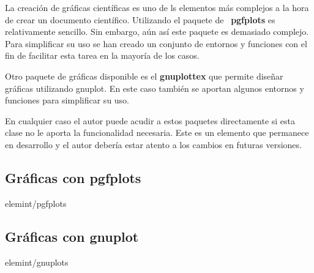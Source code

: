 La creación de gráficas científicas es uno de ls elementos más complejos a la hora de crear un documento científico. Utilizando el paquete de \LaTeXe\ \textbf{pgfplots} es relativamente sencillo. Sin embargo, aún así este paquete es demasiado complejo. Para simplificar su uso se han creado un conjunto de entornos y funciones con el fin de facilitar esta tarea en la mayoría de los casos.

Otro paquete de gráficas disponible es el \textbf{gnuplottex} que permite diseñar gráficas utilizando gnuplot. En este caso también se aportan algunos entornos y funciones para simplificar su uso.

En cualquier caso el autor puede acudir a estos paquetes directamente si esta clase no le aporta la funcionalidad necesaria. Este es un elemento que permanece en desarrollo y el autor debería estar atento a los cambios en futuras versiones.

\subsection{Gráficas con pgfplots}{elemint/pgfplots}

\subsection{Gráficas con gnuplot}{elemint/gnuplots}
